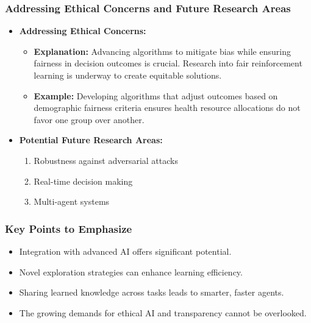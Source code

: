 \documentclass[aspectratio=169]{beamer}
\begin{document}
\begin{frame}[fragile]
    \frametitle{Addressing Ethical Concerns and Future Research Areas}
    \begin{itemize}
        \item \textbf{Addressing Ethical Concerns:}
        \begin{itemize}
            \item \textbf{Explanation:} Advancing algorithms to mitigate bias while ensuring fairness in decision outcomes is crucial. Research into fair reinforcement learning is underway to create equitable solutions.
            \item \textbf{Example:} Developing algorithms that adjust outcomes based on demographic fairness criteria ensures health resource allocations do not favor one group over another.
        \end{itemize}
        
        \item \textbf{Potential Future Research Areas:}
        \begin{enumerate}
            \item Robustness against adversarial attacks
            \item Real-time decision making
            \item Multi-agent systems
        \end{enumerate}
    \end{itemize}
\end{frame}

\begin{frame}[fragile]
    \frametitle{Key Points to Emphasize}
    \begin{itemize}
        \item Integration with advanced AI offers significant potential.
        \item Novel exploration strategies can enhance learning efficiency.
        \item Sharing learned knowledge across tasks leads to smarter, faster agents.
        \item The growing demands for ethical AI and transparency cannot be overlooked.
    \end{itemize}
\end{frame}
\end{document}
